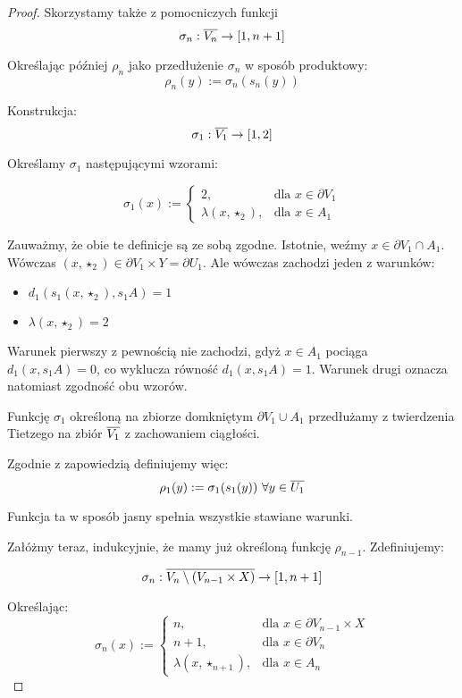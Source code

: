 \begin{thm}
\begin{proof}
  Skorzystamy także z pomocniczych funkcji
  $$\sigma_n: \overline{V_n} \rightarrow [1,n+1]$$
  
  Określając później $\rho_n$ jako przedłużenie $\sigma_n$ w sposób produktowy:
  $$\rho_n(y) := \sigma_n(s_n(y))$$

  Konstrukcja:
  $$\sigma_1: \overline{V_1} \rightarrow [1,2]$$
  
  Określamy $\sigma_1$ następującymi wzorami:
  
  $$
  \sigma_1(x) := 
    \begin{cases}
      2,&\mbox{dla }x \in \partial V_1 \\
      \lambda(x, \star_2),& \mbox{dla }x \in A_1 
    \end{cases}
  $$
  
  Zauważmy, że obie te definicje są ze sobą zgodne. Istotnie, weźmy $x \in \partial V_1 \cap A_1$. Wówczas $(x, \star_2) \in \partial V_1 \times Y = \partial U_1$. Ale wówczas zachodzi jeden z warunków:
  
  \begin{itemize}
    \item $d_1(s_1 (x, \star_2), s_1 A) = 1$
    \item $\lambda(x, \star_2) = 2$
  \end{itemize}

  Warunek pierwszy z pewnością nie zachodzi, gdyż $x \in A_1$ pociąga $d_1(x, s_1 A) = 0$, co wyklucza równość $d_1(x, s_1 A) = 1$.
  Warunek drugi oznacza natomiast zgodność obu wzorów.
  
  Funkcję $\sigma_1$ określoną na zbiorze domkniętym $\partial V_1 \cup A_1$ przedłużamy z twierdzenia Tietzego na zbiór $\overline{V_1}$ z zachowaniem ciągłości.
  
  Zgodnie z zapowiedzią definiujemy więc:
  $$\rho_1(y) := \sigma_1(s_1(y))\ \forall y \in \overline{U_1}$$
  
  Funkcja ta w sposób jasny spełnia wszystkie stawiane warunki.
  
  Załóżmy teraz, indukcyjnie, że mamy już określoną funkcję $\rho_{n-1}$. Zdefiniujemy:
  
  $$\sigma_n: \overline{V_n \setminus (V_{n-1} \times X)} \rightarrow [1,n+1]$$
  
  Określając:
  $$
  \sigma_n(x) := 
    \begin{cases}
      n,&\mbox{dla }x \in \partial V_{n-1} \times X \\
      n+1,&\mbox{dla }x \in \partial V_n \\
      \lambda(x, \star_{n+1}),&\mbox{dla }x \in A_n
    \end{cases}
  $$


\end{proof}
\end{thm}
